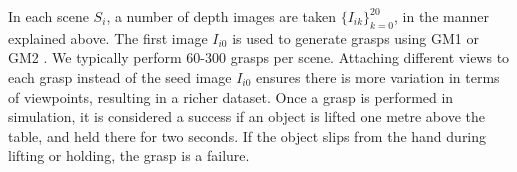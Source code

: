 
In each scene $S_i$, a number of depth images are taken $\{I_{ik}\}_{k=0}^{20}$, in the manner explained above. The first image $I_{i0}$ is used to generate grasps using GM1 \cite{kopicki2015ijrr} or GM2 \cite{kopicki2019ijrr}. We typically perform 60-300 grasps per scene. Attaching different views to each grasp instead of the seed image $I_{i0}$ ensures there is more variation in terms of viewpoints, resulting in a richer dataset. Once a grasp is performed in simulation, it is considered a success if an object is lifted one metre above the table, and held there for two seconds. If the object slips from the hand during lifting or holding, the grasp is a failure. 

